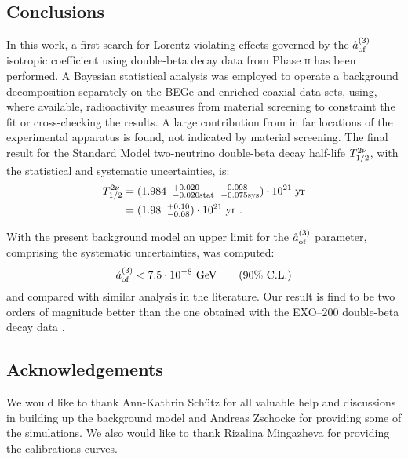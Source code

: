 \subsection*{Conclusions}
In this work, a first search for Lorentz-violating effects governed by the $\mathring{a}_\text{of}^{(3)}$ isotropic coefficient using double-beta decay data from {\gerda} Phase \textsc{ii} has been performed. A Bayesian statistical analysis was employed to operate a background decomposition separately on the BEGe and enriched coaxial data sets, using, where available, radioactivity measures from material screening to constraint the fit or cross-checking the results. A large contribution from  in far locations of the experimental apparatus is found, not indicated by material screening. The final result for the Standard Model two-neutrino double-beta decay half-life $T_{1/2}^{2\nu}$, with the statistical and systematic uncertainties, is:
\begin{equation}
	\begin{split}
		T_{1/2}^{2\nu} &=({1.984\;\;^{+0.020}_{-0.020\text{stat}}}\;\;{^{+0.098}_{-0.075\text{sys}}})\cdot10^{21}\;\text{yr}\\
				   &=(1.98\;\;^{+0.10}_{-0.08})\cdot10^{21}\;\text{yr}\ .\\
	\end{split}
\end{equation}

With the present background model an upper limit for the $\mathring{a}_\text{of}^{(3)}$ parameter, comprising the systematic uncertainties, was computed:
\begin{equation}\mathring{a}_\text{of}^{(3)}<7.5\cdot10^{-8}\ \text{GeV}\qquad(\text{90\% C.L.})\end{equation}
and compared with similar analysis in the literature. Our result is find to be two orders of magnitude better than the one obtained with the EXO--200 double-beta decay data \cite{exo200}.
\vspace*{4cm}
\subsection*{Acknowledgements}
We would like to thank Ann-Kathrin Schütz for all valuable help and discussions in building up the background model and Andreas Zschocke for providing some of the simulations. We also would like to thank Rizalina Mingazheva for providing the calibrations curves.

